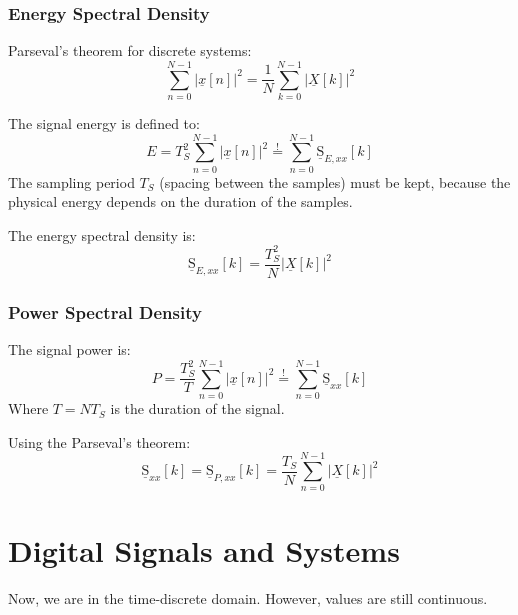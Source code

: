 \begin{refsection}
\subsubsection{Energy Spectral Density}

Parseval's theorem for discrete systems:
\begin{equation}
	\sum\limits_{n=0}^{N-1} \left|\underline{x}[n]\right|^2 = \frac{1}{N} \sum\limits_{k=0}^{N-1} \left|\underline{X}[k]\right|^2
\end{equation}

The signal energy is defined to:
\begin{equation}
	E = T_S^2 \sum\limits_{n=0}^{N-1} \left|\underline{x}[n]\right|^2 \stackrel{!}{=} \sum\limits_{n=0}^{N-1} \underline{\mathrm{S}}_{E,xx}[k]
\end{equation}
The sampling period $T_S$ (spacing between the samples) must be kept, because the physical energy depends on the duration of the samples.

The energy spectral density is:
\begin{equation}
	\underline{\mathrm{S}}_{E,xx}[k] = \frac{T_S^2}{N} \left|\underline{X}[k]\right|^2
\end{equation}

\subsubsection{Power Spectral Density}

The signal power is:
\begin{equation}
	P = \frac{T_S^2}{T} \sum\limits_{n=0}^{N-1} \left|\underline{x}[n]\right|^2 \stackrel{!}{=} \sum\limits_{n=0}^{N-1} \underline{\mathrm{S}}_{xx}[k]
\end{equation}
Where $T = N T_S$ is the duration of the signal.

Using the Parseval's theorem:
\begin{equation}
	\underline{\mathrm{S}}_{xx}[k] = \underline{\mathrm{S}}_{P,xx}[k] = \frac{T_S}{N} \sum\limits_{n=0}^{N-1} \left|\underline{X}[k]\right|^2
\end{equation}

\section{Digital Signals and Systems}

Now, we are in the time-discrete domain. However, values are still continuous.


\end{refsection}
